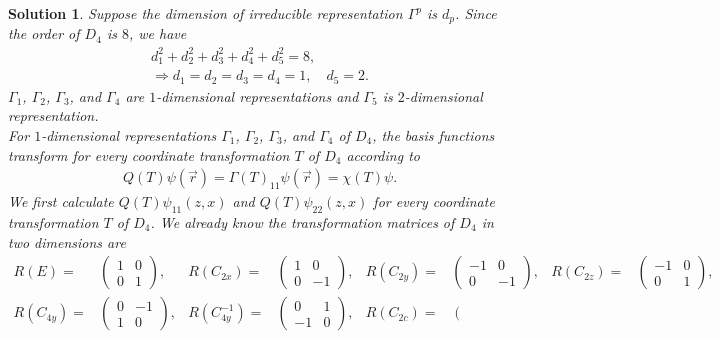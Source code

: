 \documentclass[UTF8,10pt,a4paper]{article}
\theoremstyle{Problem}
\theoremstyle{Solution}
\newtheorem*{sol}{Solution}
\begin{document}
\begin{sol}
    Suppose the dimension of irreducible representation $\Gamma^p$ is $d_p$. Since the order of $D_4$ is $8$, we have
    \begin{gather}
        d_1^2+d_2^2+d_3^2+d_4^2+d_5^2=8,\\
        \Longrightarrow d_1=d_2=d_3=d_4=1,\quad d_5=2.
    \end{gather}
    $\Gamma_1$, $\Gamma_2$, $\Gamma_3$, and $\Gamma_4$ are $1$-dimensional representations and $\Gamma_5$ is $2$-dimensional representation.\\
    For $1$-dimensional representations $\Gamma_1$, $\Gamma_2$, $\Gamma_3$, and $\Gamma_4$ of $D_4$, the basis functions transform for every coordinate transformation $T$ of $D_4$ according to
    \begin{align}
        Q(T)\psi(\vec{r})=\Gamma(T)_{11}\psi(\vec{r})=\chi(T)\psi.
    \end{align}
    We first calculate $Q(T)\psi_{11}(z,x)$ and $Q(T)\psi_{22}(z,x)$ for every coordinate transformation $T$ of $D_4$. We already know the transformation matrices of $D_4$ in two dimensions are
    \begin{align*}
        R(E)=&\left(\begin{matrix}
            1&0\\
            0&1
        \end{matrix}\right),&R(C_{2x})=&\left(\begin{matrix}
            1&0\\
            0&-1
        \end{matrix}\right),&R(C_{2y})=&\left(\begin{matrix}
            -1&0\\
            0&-1
        \end{matrix}\right),&R(C_{2z})=&\left(\begin{matrix}
            -1&0\\
            0&1
        \end{matrix}\right),\\
        R(C_{4y})=&\left(\begin{matrix}
            0&-1\\
            1&0
        \end{matrix}\right),&R(C_{4y}^{-1})=&\left(\begin{matrix}
            0&1\\
            -1&0
        \end{matrix}\right),&R(C_{2c})=&\left(\begin{matrix}

\end{matrix}
\end{align*}
\end{sol}
\end{document}
